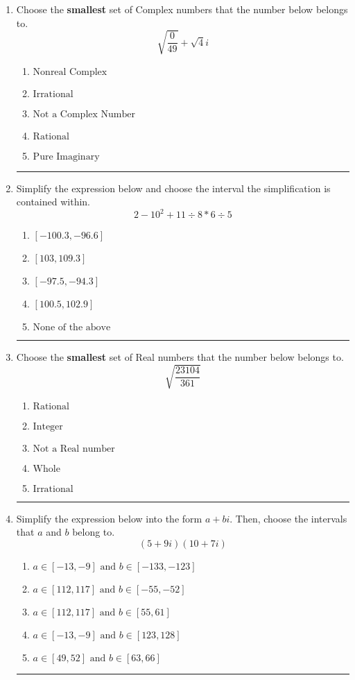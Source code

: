 \documentclass[14pt]{extbook}
\newcommand{\litem}[1]{\item#1\hspace*{-1cm}\rule{\textwidth}{0.4pt}}
\begin{document}
\begin{enumerate}
\litem{
Choose the \textbf{smallest} set of Complex numbers that the number below belongs to.\[ \sqrt{\frac{0}{49}}+\sqrt{4}i \]\begin{enumerate}[label=\Alph*.]
\item \( \text{Nonreal Complex} \)
\item \( \text{Irrational} \)
\item \( \text{Not a Complex Number} \)
\item \( \text{Rational} \)
\item \( \text{Pure Imaginary} \)

\end{enumerate} }
\litem{
Simplify the expression below and choose the interval the simplification is contained within.\[ 2 - 10^2 + 11 \div 8 * 6 \div 5 \]\begin{enumerate}[label=\Alph*.]
\item \( [-100.3, -96.6] \)
\item \( [103, 109.3] \)
\item \( [-97.5, -94.3] \)
\item \( [100.5, 102.9] \)
\item \( \text{None of the above} \)

\end{enumerate} }
\litem{
Choose the \textbf{smallest} set of Real numbers that the number below belongs to.\[ \sqrt{\frac{23104}{361}} \]\begin{enumerate}[label=\Alph*.]
\item \( \text{Rational} \)
\item \( \text{Integer} \)
\item \( \text{Not a Real number} \)
\item \( \text{Whole} \)
\item \( \text{Irrational} \)

\end{enumerate} }
\litem{
Simplify the expression below into the form $a+bi$. Then, choose the intervals that $a$ and $b$ belong to.\[ (5 + 9 i)(10 + 7 i) \]\begin{enumerate}[label=\Alph*.]
\item \( a \in [-13, -9] \text{ and } b \in [-133, -123] \)
\item \( a \in [112, 117] \text{ and } b \in [-55, -52] \)
\item \( a \in [112, 117] \text{ and } b \in [55, 61] \)
\item \( a \in [-13, -9] \text{ and } b \in [123, 128] \)
\item \( a \in [49, 52] \text{ and } b \in [63, 66] \)


\end{enumerate}}
\end{enumerate}
\end{document}
